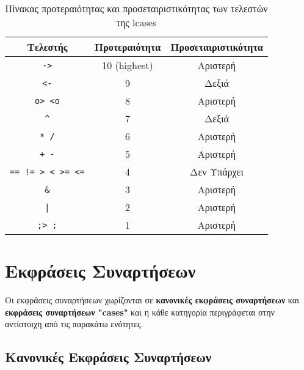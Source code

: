 \documentclass[diploma]{softlab-thesis}
\begin{document}
\begin{table}[h]

\caption{
Πίνακας προτεραιότητας και προσεταιριστικότητας των τελεστών της lcases
}

\begin{center}
\begin{tabular}{ |c|c|c| }
\hline
Τελεστής & Προτεραιότητα & Προσεταιριστικότητα
\\
\hline
\hline
\verb|->| & 10 (highest) & Αριστερή
\\
\hline
\verb|<-| & 9 & Δεξιά
\\
\hline
\verb|o> <o| & 8 & Αριστερή
\\
\hline
\verb|^| & 7 & Δεξιά
\\
\hline
\verb|* /| & 6 & Αριστερή
\\
\hline
\verb|+ -| & 5 & Αριστερή
\\
\hline
\verb|== != > < >= <=| & 4 & Δεν Υπάρχει
\\
\hline
\verb|&| & 3 & Αριστερή
\\
\hline
\texttt{|} & 2 & Αριστερή
\\
\hline
\verb|;> ;| & 1 & Αριστερή
\\
\hline
\end{tabular}
\end{center}

\label{table:precassocgr}

\end{table}

\newpage
\section{Εκφράσεις Συναρτήσεων}

Οι εκφράσεις συναρτήσεων χωρίζονται σε \textbf{κανονικές εκφράσεις
συναρτήσεων} και \textbf{εκφράσεις συναρτήσεων "cases"} και η κάθε
κατηγορία περιγράφεται στην αντίστοιχη από τις παρακάτω ενότητες.

\subsection{Κανονικές Εκφράσεις Συναρτήσεων}
\end{document}
